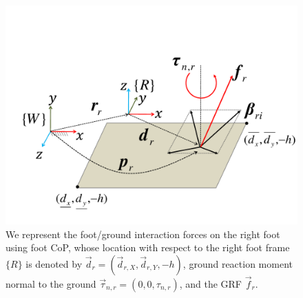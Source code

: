 \documentclass{llncs}
\newcommand {\mat}[1] {{\bf #1}}
\newcommand{\mR} {\mat{R}}
\newcommand{\vp}{\vec{p}}
\newcommand{\vr}{\vec{r}}
\newcommand{\vbeta}{\vec{\beta}}
\newcommand{\vtau}{\vec{\tau}}
\newcommand{\vd}{\vec{d}}
\newcommand{\vf}{\vec{f}}
\begin{document}
\begin{figure}
\begin{center}
\includegraphics[width = 0.7\columnwidth]{Figures/foot_new.pdf}
\end{center}
\caption{We represent the foot/ground interaction forces on
the right foot using foot CoP, whose location with respect to
 the right
foot frame $\{R\}$ is denoted by $\vd_r=(\vd_{r,X},\vd_{r,Y},-h)$, ground reaction
moment normal to the ground $\vtau_{n,r}=(0,0,\tau_{n,r})$, and the GRF $\vf_r$.
}
\label{fig:foot}
\end{figure}
\end{document}
